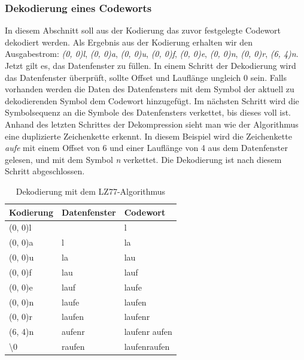 \subsubsection{Dekodierung eines Codeworts}
\label{subsubsec:dekodierung_codewort}
In diesem Abschnitt soll aus der Kodierung das zuvor festgelegte Codewort dekodiert werden.
Als Ergebnis aus der Kodierung erhalten wir den Ausgabestrom: \newline
 \textit{(0, 0)l}, \textit{(0, 0)a}, \textit{(0, 0)u}, \textit{(0, 0)f}, \textit{(0, 0)e}, \textit{(0, 0)n}, \textit{(0, 0)r}, \textit{(6, 4)n}. \newline
Jetzt gilt es, das Datenfenster zu füllen.
In einem Schritt der Dekodierung wird das Datenfenster überprüft, sollte Offset und Lauflänge ungleich 0 sein.
Falls vorhanden werden die Daten des Datenfensters mit dem Symbol der aktuell zu dekodierenden Symbol dem Codewort hinzugefügt.
Im nächsten Schritt wird die Symbolsequenz an die Symbole des Datenfensters verkettet, bis dieses voll ist.
Anhand des letzten Schrittes der Dekompression sieht man wie der Algorithmus eine duplizierte Zeichenkette erkennt.
In diesem Beispiel wird die Zeichenkette \textit{aufe} mit einem Offset von 6 und einer Lauflänge von 4 aus dem Datenfenster gelesen, und mit dem Symbol \textit{n} verkettet.
Die Dekodierung ist nach diesem Schritt abgeschlossen.
\newline
\begin{table}[H]
\centering
\begin{tabular}{|l|l|l|}
\hline
\textbf{Kodierung} & \textbf{Datenfenster}         & \textbf{Codewort} \\ \hline
(0, 0)l            &                               & l                 \\ \hline
(0, 0)a            & l                             & la                \\ \hline
(0, 0)u            & la                            & lau               \\ \hline
(0, 0)f            & lau                           & lauf              \\ \hline
(0, 0)e            & lauf                          & laufe             \\ \hline
(0, 0)n            & laufe                         & laufen            \\ \hline
(0, 0)r            & laufen                        & laufenr           \\ \hline
{\color[HTML]{009901}(6, 4)n}            & {\color[HTML]{009901} aufe}nr & laufenr{\color[HTML]{009901} aufen}      \\ \hline
\textbackslash 0   & raufen 					   & laufenraufen 		\\ \hline
\end{tabular}
\label{tab:lz77_decode_table}
\caption{Dekodierung mit dem LZ77-Algorithmus}
\end{table}

